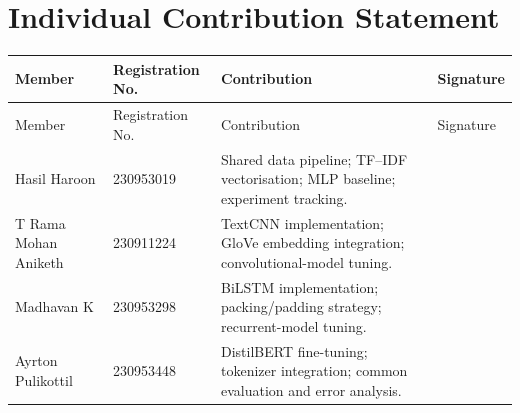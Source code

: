 \documentclass[12pt,a4paper]{article}
\begin{document}
\clearpage
\section*{Individual Contribution Statement}
\begin{longtable}{p{}p{}p{}p{}}
\toprule
Member & Registration No. & Contribution & Signature\\
\midrule
\endfirsthead
\toprule
Member & Registration No. & Contribution & Signature\\
\midrule
\endhead
Hasil Haroon & 230953019 & Shared data pipeline; TF--IDF vectorisation; MLP baseline; experiment tracking. & \\
T Rama Mohan Aniketh & 230911224 & TextCNN implementation; GloVe embedding integration; convolutional-model tuning. & \\
Madhavan K & 230953298 & BiLSTM implementation; packing/padding strategy; recurrent-model tuning. & \\
Ayrton Pulikottil & 230953448 & DistilBERT fine-tuning; tokenizer integration; common evaluation and error analysis. & \\
\bottomrule
\end{longtable}
\end{document}
